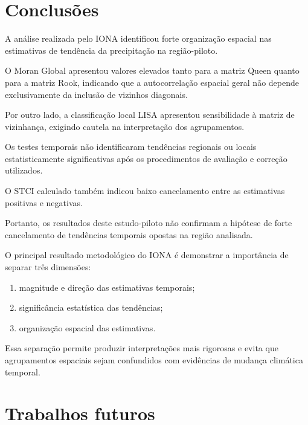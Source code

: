 \documentclass[12pt,a4paper]{article}
\begin{document}
\section{Conclusões}

A análise realizada pelo IONA identificou forte
organização espacial nas estimativas de tendência
da precipitação na região-piloto.

O Moran Global apresentou valores elevados tanto
para a matriz Queen quanto para a matriz Rook,
indicando que a autocorrelação espacial geral
não depende exclusivamente da inclusão de
vizinhos diagonais.

Por outro lado, a classificação local LISA
apresentou sensibilidade à matriz de vizinhança,
exigindo cautela na interpretação dos agrupamentos.

Os testes temporais não identificaram tendências
regionais ou locais estatisticamente significativas
após os procedimentos de avaliação e correção
utilizados.

O STCI calculado também indicou baixo cancelamento
entre as estimativas positivas e negativas.

Portanto, os resultados deste estudo-piloto não
confirmam a hipótese de forte cancelamento de
tendências temporais opostas na região analisada.

O principal resultado metodológico do IONA é
demonstrar a importância de separar três dimensões:

\begin{enumerate}
    \item magnitude e direção das estimativas
    temporais;
    \item significância estatística das tendências;
    \item organização espacial das estimativas.
\end{enumerate}

Essa separação permite produzir interpretações
mais rigorosas e evita que agrupamentos espaciais
sejam confundidos com evidências de mudança
climática temporal.

\section{Trabalhos futuros}
\end{document}

